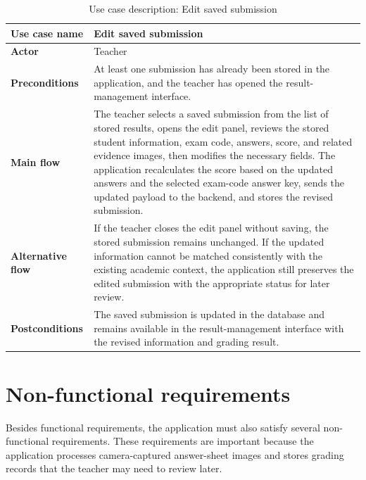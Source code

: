 \documentclass[../Main.tex]{subfiles}
\begin{document}
\begin{table}[H]
    \centering
    \caption{Use case description: Edit saved submission}
    \label{table:uc_edit_saved_submission}
    \renewcommand{\arraystretch}{1.25}
    \begin{tabular}{|p{}|p{}|}
        \hline
        \textbf{Use case name} & Edit saved submission \\
        \hline
        \textbf{Actor} & Teacher \\
        \hline
        \textbf{Preconditions} & At least one submission has already been stored in the application, and the teacher has opened the result-management interface. \\
        \hline
        \textbf{Main flow} & The teacher selects a saved submission from the list of stored results, opens the edit panel, reviews the stored student information, exam code, answers, score, and related evidence images, then modifies the necessary fields. The application recalculates the score based on the updated answers and the selected exam-code answer key, sends the updated payload to the backend, and stores the revised submission. \\
        \hline
        \textbf{Alternative flow} & If the teacher closes the edit panel without saving, the stored submission remains unchanged. If the updated information cannot be matched consistently with the existing academic context, the application still preserves the edited submission with the appropriate status for later review. \\
        \hline
        \textbf{Postconditions} & The saved submission is updated in the database and remains available in the result-management interface with the revised information and grading result. \\
        \hline
    \end{tabular}
\end{table}

\section{Non-functional requirements}
\label{section:2.4}

Besides functional requirements, the application must also satisfy several
non-functional requirements. These requirements are important because the application
processes camera-captured answer-sheet images and stores grading records that the
teacher may need to review later.
\end{document}
